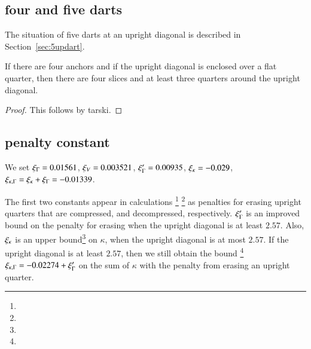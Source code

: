 \subsection{four and five darts} %
    \label{sec:five-anchors}



\begin{remark}\label{rem:5dart}
The situation of five darts at an upright diagonal is
described in Section~\ref{sec:5updart}.
\end{remark}


\begin{lemma}
If there are four anchors and if the upright diagonal is enclosed over a
flat quarter, then there are four slices and at least three
quarters around the upright diagonal.
\end{lemma}

\begin{proof}
This follows by tarski.
\end{proof}


\subsection{penalty constant}

\begin{definition}
We set $\xi_\Gamma = 0.01561$, $\xi_V = 0.003521$, $\xi_\Gamma'=0.00935$,
$\xi_\kappa=-0.029$, $\xi_{\kappa,\Gamma} = \xi_\kappa+\xi_\Gamma = -0.01339$.
\end{definition}

The first two constants appear in calculations%
\footnote{} %
\footnote{} %
as penalties for erasing upright quarters that are compressed, and
decompressed, respectively. $\xi_\Gamma'$ is an improved bound on the
penalty for erasing when the upright diagonal is at least $2.57$.
Also, $\xi_\kappa$ is an upper bound\footnote{} %
 on $\kappa$, when the
upright diagonal is at most $2.57$.  If the upright diagonal is at
least $2.57$, then we still obtain the bound%
\footnote{} %
$\xi_{\kappa,\Gamma} =-0.02274+\xi_\Gamma'$ on the sum of $\kappa$ with the
penalty from erasing an upright quarter.


